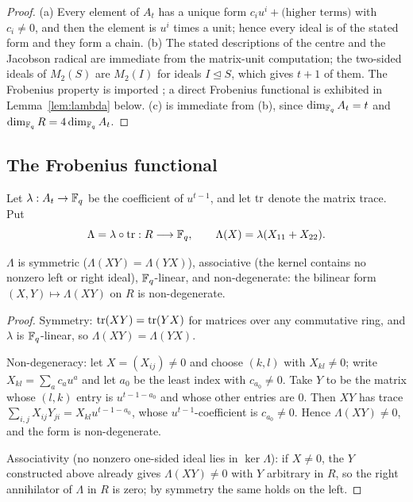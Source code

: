\begin{proof}
(a) Every element of $A_t$ has a unique form $c_{i}u^i+\text{(higher terms)}$
with $c_i\ne0$, and then the element is $u^i$ times a unit; hence every ideal is
of the stated form and they form a chain. (b) The stated descriptions of the
centre and the Jacobson radical are immediate from the matrix-unit computation;
the two-sided ideals of $M_2(S)$ are $M_2(I)$ for ideals $I\trianglelefteq S$,
which gives $t+1$ of them. The Frobenius property is imported
\cite{Wood1999Duality}; a direct Frobenius functional is exhibited in
Lemma~\ref{lem:lambda} below. (c) is immediate from (b), since
$\dim_{\mathbb F_q}A_t=t$ and $\dim_{\mathbb F_q}R=4\dim_{\mathbb F_q}A_t$.
\end{proof}

\subsection{The Frobenius functional}\label{subsec:lambda}

Let $\lambda:A_t\to\mathbb F_q$ be the coefficient of $u^{t-1}$, and let
$\operatorname{tr}$ denote the matrix trace. Put
\begin{equation}\label{eq:Lambda}
  \Lambda=\lambda\circ\operatorname{tr}:R\longrightarrow\mathbb F_q,\qquad
  \Lambda(X)=\lambda(X_{11}+X_{22}) .
\end{equation}

\begin{lemma}\label{lem:lambda}
$\Lambda$ is symmetric ($\Lambda(XY)=\Lambda(YX)$), associative (the kernel
contains no nonzero left or right ideal), $\mathbb F_q$-linear, and non-degenerate:
the bilinear form $(X,Y)\mapsto\Lambda(XY)$ on $R$ is non-degenerate.
\end{lemma}

\begin{proof}
Symmetry: $\operatorname{tr}(XY)=\operatorname{tr}(YX)$ for matrices over any commutative ring, and $\lambda$
is $\mathbb F_q$-linear, so $\Lambda(XY)=\Lambda(YX)$.

Non-degeneracy: let $X=(X_{ij})\ne0$ and choose $(k,l)$ with $X_{kl}\ne0$;
write $X_{kl}=\sum_ac_au^a$ and let $a_0$ be the least index with $c_{a_0}\ne0$.
Take $Y$ to be the matrix whose $(l,k)$ entry is $u^{t-1-a_0}$ and whose other
entries are $0$. Then $XY$ has trace
$\sum_{i,j}X_{ij}Y_{ji}=X_{kl}u^{t-1-a_0}$, whose $u^{t-1}$-coefficient is
$c_{a_0}\ne0$. Hence $\Lambda(XY)\ne0$, and the form is non-degenerate.

Associativity (no nonzero one-sided ideal lies in $\ker\Lambda$): if
$X\ne0$, the $Y$ constructed above already gives $\Lambda(XY)\ne0$ with $Y$
arbitrary in $R$, so the right annihilator of $\Lambda$ in $R$ is zero; by
symmetry the same holds on the left.
\end{proof}


